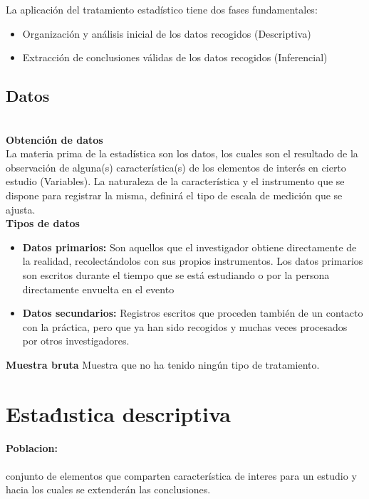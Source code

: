 \documentclass{article}
\begin{document}
\vspace{5 mm}
La aplicación del tratamiento estadístico tiene dos fases fundamentales:

\begin{itemize}
    \item Organización y análisis inicial de los datos recogidos (Descriptiva)
    \item Extracción de conclusiones válidas de los datos recogidos (Inferencial)
\end{itemize}

 \subsection{Datos}\\
    \textbf{Obtención de datos}\\
La materia prima de la estadística son los datos, los cuales son el resultado de la observación de alguna(s) característica(s) de los elementos de interés en cierto estudio (Variables). La naturaleza de la característica y el instrumento que se dispone para registrar la misma, deﬁnirá el tipo de escala de medición que se ajusta.\\

    \textbf{Tipos de datos}
    \begin{itemize}
        \item \textbf{Datos primarios:} Son aquellos que el investigador obtiene directamente de la realidad, recolectándolos con sus propios instrumentos. Los datos primarios son escritos durante el tiempo que se está estudiando o por la persona directamente envuelta en el evento
        \item \textbf{Datos secundarios:}
        Registros escritos que proceden también de un contacto con la práctica, pero que ya han sido recogidos y muchas veces procesados por otros investigadores.
    \end{itemize}
    
    \textbf{Muestra bruta}
    Muestra que no ha tenido ningún tipo de tratamiento.

\section{Estad́ıstica descriptiva}
\paragraph{Poblacion:}
conjunto de elementos que comparten característica de interes para un estudio y hacia los cuales se extenderán las conclusiones.
\end{document}

